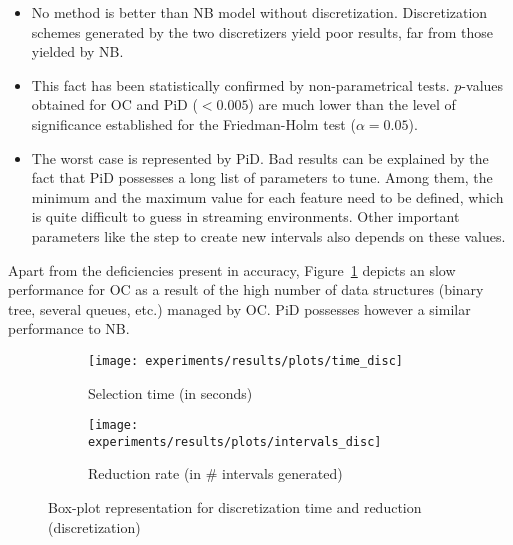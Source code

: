 \documentclass[preprint,12pt]{elsarticle}
\begin{document}
\begin{table}[!htp]
\renewcommand{\arraystretch}{1.3}
\centering
\scriptsize
\caption{Wilcoxon test results and average rankings of methods (Friedman Procedure \& Adjusted p-value with Holm's Test) for accuracy}
\label{tab:wilcoxon-disc}
\end{table}

\begin{itemize}
	\item No method is better than NB model without discretization. Discretization schemes generated by the two discretizers yield poor results, far from those yielded by NB. 
	\item This fact has been statistically confirmed by non-parametrical tests. $p$-values obtained for OC and PiD ($<0.005$) are much lower than the level of significance established for the Friedman-Holm test ($\alpha = 0.05$).
	\item The worst case is represented by PiD. Bad results can be explained by the fact that PiD possesses a long list of parameters to tune. Among them, the minimum and the maximum value for each feature need to be defined, which is quite difficult to guess in streaming environments. Other important parameters like the step to create new intervals also depends on these values.
\end{itemize}

Apart from the deficiencies present in accuracy, Figure~\ref{fig:time-disc} depicts an slow performance for OC as a result of the high number of data structures (binary tree, several queues, etc.) managed by OC. PiD possesses however a similar performance to NB. 

\begin{figure}
\begin{subfigure}{.5\textwidth}
  \centering
  \texttt{[image: experiments/results/plots/time\_disc]}
  \caption{Selection time (in seconds)}
  \label{fig:time-disc}
\end{subfigure}%
\begin{subfigure}{.5\textwidth}
  \centering
  \texttt{[image: experiments/results/plots/intervals\_disc]}
  \caption{Reduction rate (in \# intervals generated)}
  \label{fig:interv-disc}
\end{subfigure}
\caption{Box-plot representation for discretization time and reduction (discretization)}
\label{fig:disc}
\end{figure}
\end{document}

